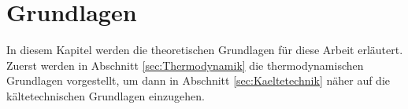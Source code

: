 \chapter{Grundlagen}
\label{cha:Grundlagen}



In diesem Kapitel werden die  theoretischen Grundlagen für diese Arbeit erläutert. 
Zuerst werden in Abschnitt \ref{sec:Thermodynamik} die thermodynamischen Grundlagen vorgestellt, um dann in Abschnitt \ref{sec:Kaeltetechnik} näher auf die kältetechnischen Grundlagen einzugehen. 






